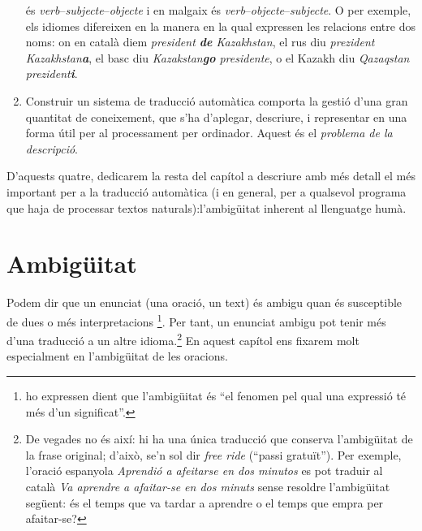 \begin{enumerate}
  és \emph{verb}--\emph{subjecte}--\emph{objecte} i en malgaix és
  \emph{verb}--\emph{objecte}--\emph{subjecte}.  O per exemple, els
  idiomes difereixen en la manera en la qual expressen les relacions
  entre dos noms: on en català diem \emph{president \textbf{de}
    Kazakhstan}, el rus diu \emph{prezident Kazakhstan\textbf{a}}, el
  basc diu \emph{Kazakstan\textbf{go} presidente}, o el Kazakh diu
  \emph{Qazaqstan prezident\textbf{i}}.
  \item Construir un sistema de traducció automàtica comporta la
    gestió d'una gran quantitat de coneixement, que s'ha d'aplegar,
    descriure, i representar en una forma útil per al processament per
    ordinador. Aquest és el \emph{problema de la descripció}.
\end{enumerate}



D'aquests quatre, dedicarem la resta del capítol a descriure amb més
detall el més important per a la traducció automàtica (i en general,
per a qualsevol programa que haja de processar textos
naturals):l'am\-bi\-güi\-tat inherent al llenguatge humà.

\section{Ambigüitat}

Podem dir que un enunciat (una oració, un text) és ambigu quan és
susceptible de dues o més interpretacions
\citep{alcaraz97b}\footnote{\citet{don96u} ho expressen dient que
  l'ambigüitat és ``el fenomen pel qual una expressió té més d'un
  significat''.}. Per tant, un enunciat ambigu pot tenir més d'una
traducció a un altre idioma.\footnote{De vegades no és així: hi ha una
  única traducció que conserva l'ambigüitat de la frase original;
  d'això, se'n sol dir \emph{free ride} (``passi gratuït''). Per
  exemple, l'oració espanyola \emph{Aprendió a afeitarse en dos
    minutos} es pot traduir al català \emph{Va aprendre a afaitar-se
    en dos minuts} sense resoldre l'ambigüitat següent: és el temps
  que va tardar a aprendre o el temps que empra per afaitar-se?} En
aquest capítol ens fixarem molt especialment en l'ambigüitat de les
oracions.

